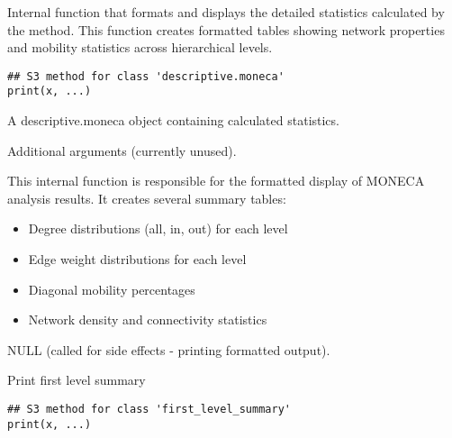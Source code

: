 \documentclass[a4paper]{book}
\begin{document}
%
\begin{Description}
Internal function that formats and displays the detailed statistics calculated
by the  method. This function creates formatted tables showing
network properties and mobility statistics across hierarchical levels.
\end{Description}
%
\begin{Usage}
\begin{verbatim}
## S3 method for class 'descriptive.moneca'
print(x, ...)
\end{verbatim}
\end{Usage}
%
\begin{Arguments}
\begin{ldescription}
\item[\code{x}] A descriptive.moneca object containing calculated statistics.

\item[\code{...}] Additional arguments (currently unused).
\end{ldescription}
\end{Arguments}
%
\begin{Details}
This internal function is responsible for the formatted display of MONECA
analysis results. It creates several summary tables:
\begin{itemize}

\item{} Degree distributions (all, in, out) for each level
\item{} Edge weight distributions for each level
\item{} Diagonal mobility percentages
\item{} Network density and connectivity statistics

\end{itemize}

\end{Details}
%
\begin{Value}
NULL (called for side effects - printing formatted output).
\end{Value}
%
\begin{Description}
Print first level summary
\end{Description}
%
\begin{Usage}
\begin{verbatim}
## S3 method for class 'first_level_summary'
print(x, ...)
\end{verbatim}
\end{Usage}
\end{document}
